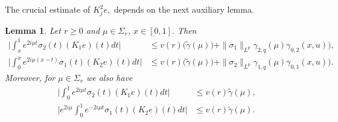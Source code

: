 \documentclass[11pt]{amsart}
\theoremstyle{plain}
\newtheorem{lem}[thm]{Lemma}
\theoremstyle{definition}
\theoremstyle{remark}
\numberwithin{equation}{section}
\begin{document}
The crucial estimate of $K^2_je,$ depends on the next auxiliary lemma.
\begin{lem}\label{estKint}
Let $r\ge 0$ and $\mu \in \Sigma_r$, $x\in [0,1].$  Then
\begin{align}
\Big|\int_x^1 e^{2i \mu t }\sigma_2(t)(K_1e)(t)dt\Big|&\leq v(r) \Big( \widetilde{\gamma}(\mu))+\|\sigma_1\|_{L^p}\gamma_{2,q}(\mu)\gamma_{0,2}(x,u)\Big),\label{intK1}\\
\Big|\int_0^x e^{2i \mu(x- t) }\sigma_1(t)(K_2e)(t)dt\Big|&\leq v(r) \Big( \widetilde{\gamma}(\mu))+\|\sigma_2\|_{L^p}\gamma_{1,q}(\mu)\gamma_{0,1}(x,u)\Big).\nonumber
\end{align}
Moreover, for $\mu \in \Sigma_r$ we also have
\begin{align*}
\Big|\int_0^1 e^{2i \mu t }\sigma_2(t)(K_1e)(t)dt\Big|&\leq v(r) \widetilde{\gamma}(\mu),\\
\Big|e^{2i \mu}\int_0^1 e^{-2i \mu t }\sigma_1(t)(K_2e)(t)dt\Big|&\leq v(r)  \widetilde{\gamma}(\mu).
\end{align*}
\end{lem}
\end{document}

